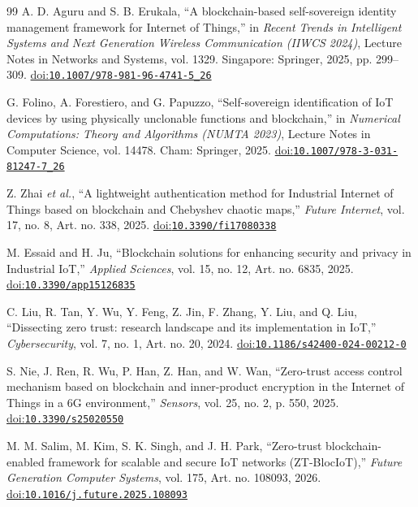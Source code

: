\begin{thebibliography}{99}
A. D. Aguru and S. B. Erukala, ``A blockchain-based self-sovereign identity management framework for Internet of Things,'' in \emph{Recent Trends in Intelligent Systems and Next Generation Wireless Communication (IIWCS 2024)}, Lecture Notes in Networks and Systems, vol. 1329. Singapore: Springer, 2025, pp. 299--309. \href{https://doi.org/10.1007/978-981-96-4741-5_26}{doi:\nolinkurl{10.1007/978-981-96-4741-5_26}}

G. Folino, A. Forestiero, and G. Papuzzo, ``Self-sovereign identification of IoT devices by using physically unclonable functions and blockchain,'' in \emph{Numerical Computations: Theory and Algorithms (NUMTA 2023)}, Lecture Notes in Computer Science, vol. 14478. Cham: Springer, 2025. \href{https://doi.org/10.1007/978-3-031-81247-7_26}{doi:\nolinkurl{10.1007/978-3-031-81247-7_26}}

Z. Zhai \emph{et al.}, ``A lightweight authentication method for Industrial Internet of Things based on blockchain and Chebyshev chaotic maps,'' \emph{Future Internet}, vol. 17, no. 8, Art. no. 338, 2025. \href{https://doi.org/10.3390/fi17080338}{doi:\nolinkurl{10.3390/fi17080338}}

M. Essaid and H. Ju, ``Blockchain solutions for enhancing security and privacy in Industrial IoT,'' \emph{Applied Sciences}, vol. 15, no. 12, Art. no. 6835, 2025. \href{https://doi.org/10.3390/app15126835}{doi:\nolinkurl{10.3390/app15126835}}

C. Liu, R. Tan, Y. Wu, Y. Feng, Z. Jin, F. Zhang, Y. Liu, and Q. Liu, ``Dissecting zero trust: research landscape and its implementation in IoT,'' \emph{Cybersecurity}, vol. 7, no. 1, Art. no. 20, 2024. \href{https://doi.org/10.1186/s42400-024-00212-0}{doi:\nolinkurl{10.1186/s42400-024-00212-0}}

S. Nie, J. Ren, R. Wu, P. Han, Z. Han, and W. Wan, ``Zero-trust access control mechanism based on blockchain and inner-product encryption in the Internet of Things in a 6G environment,'' \emph{Sensors}, vol. 25, no. 2, p. 550, 2025. \href{https://doi.org/10.3390/s25020550}{doi:\nolinkurl{10.3390/s25020550}}

M. M. Salim, M. Kim, S. K. Singh, and J. H. Park, ``Zero-trust blockchain-enabled framework for scalable and secure IoT networks (ZT-BlocIoT),'' \emph{Future Generation Computer Systems}, vol. 175, Art. no. 108093, 2026. \href{https://doi.org/10.1016/j.future.2025.108093}{doi:\nolinkurl{10.1016/j.future.2025.108093}}


\end{thebibliography}
